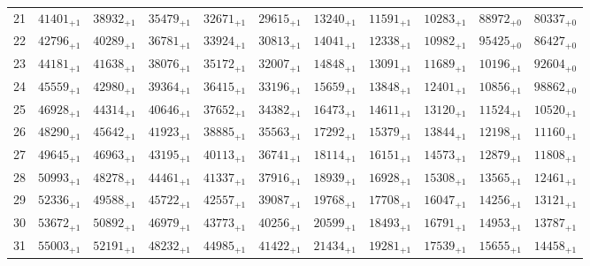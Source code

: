 \documentclass[10pt, a4paper]{article}
\begin{document}
\begin{center}
\begin{longtable}{c || c c c c c | c c c c c}
        \hline
        21 & \({41401}_{+1}\) & \({38932}_{+1}\) & \({35479}_{+1}\) & \({32671}_{+1}\) & \({29615}_{+1}\) & \({13240}_{+1}\) & \({11591}_{+1}\) & \({10283}_{+1}\) & \({88972}_{+0}\) & \({80337}_{+0}\)\\
        22 & \({42796}_{+1}\) & \({40289}_{+1}\) & \({36781}_{+1}\) & \({33924}_{+1}\) & \({30813}_{+1}\) & \({14041}_{+1}\) & \({12338}_{+1}\) & \({10982}_{+1}\) & \({95425}_{+0}\) & \({86427}_{+0}\)\\
        23 & \({44181}_{+1}\) & \({41638}_{+1}\) & \({38076}_{+1}\) & \({35172}_{+1}\) & \({32007}_{+1}\) & \({14848}_{+1}\) & \({13091}_{+1}\) & \({11689}_{+1}\) & \({10196}_{+1}\) & \({92604}_{+0}\)\\
        24 & \({45559}_{+1}\) & \({42980}_{+1}\) & \({39364}_{+1}\) & \({36415}_{+1}\) & \({33196}_{+1}\) & \({15659}_{+1}\) & \({13848}_{+1}\) & \({12401}_{+1}\) & \({10856}_{+1}\) & \({98862}_{+0}\)\\
        25 & \({46928}_{+1}\) & \({44314}_{+1}\) & \({40646}_{+1}\) & \({37652}_{+1}\) & \({34382}_{+1}\) & \({16473}_{+1}\) & \({14611}_{+1}\) & \({13120}_{+1}\) & \({11524}_{+1}\) & \({10520}_{+1}\)\\
        \hline
        26 & \({48290}_{+1}\) & \({45642}_{+1}\) & \({41923}_{+1}\) & \({38885}_{+1}\) & \({35563}_{+1}\) & \({17292}_{+1}\) & \({15379}_{+1}\) & \({13844}_{+1}\) & \({12198}_{+1}\) & \({11160}_{+1}\)\\
        27 & \({49645}_{+1}\) & \({46963}_{+1}\) & \({43195}_{+1}\) & \({40113}_{+1}\) & \({36741}_{+1}\) & \({18114}_{+1}\) & \({16151}_{+1}\) & \({14573}_{+1}\) & \({12879}_{+1}\) & \({11808}_{+1}\)\\
        28 & \({50993}_{+1}\) & \({48278}_{+1}\) & \({44461}_{+1}\) & \({41337}_{+1}\) & \({37916}_{+1}\) & \({18939}_{+1}\) & \({16928}_{+1}\) & \({15308}_{+1}\) & \({13565}_{+1}\) & \({12461}_{+1}\)\\
        29 & \({52336}_{+1}\) & \({49588}_{+1}\) & \({45722}_{+1}\) & \({42557}_{+1}\) & \({39087}_{+1}\) & \({19768}_{+1}\) & \({17708}_{+1}\) & \({16047}_{+1}\) & \({14256}_{+1}\) & \({13121}_{+1}\)\\
        30 & \({53672}_{+1}\) & \({50892}_{+1}\) & \({46979}_{+1}\) & \({43773}_{+1}\) & \({40256}_{+1}\) & \({20599}_{+1}\) & \({18493}_{+1}\) & \({16791}_{+1}\) & \({14953}_{+1}\) & \({13787}_{+1}\)\\
        \hline
        31 & \({55003}_{+1}\) & \({52191}_{+1}\) & \({48232}_{+1}\) & \({44985}_{+1}\) & \({41422}_{+1}\) & \({21434}_{+1}\) & \({19281}_{+1}\) & \({17539}_{+1}\) & \({15655}_{+1}\) & \({14458}_{+1}\)\\

\end{longtable}
\end{center}
\end{document}
